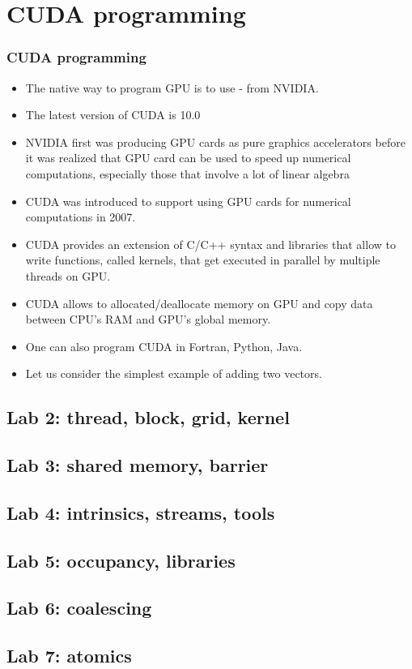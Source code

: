 \section{CUDA programming}
\begin{frame}[fragile]
  \frametitle{CUDA programming}
\begin{itemize}
\item The native way to program GPU is to use  - from NVIDIA. 
\item The latest version of CUDA is 10.0
\item NVIDIA first was producing GPU cards as pure graphics accelerators before it was realized that GPU card can be used to speed up numerical computations, especially those that involve a lot of linear algebra
\item CUDA was introduced to support using GPU cards for numerical computations in 2007.
\item CUDA provides an extension of C/C++ syntax and libraries that allow to write functions, called {\color{mycolordef}kernels}, that get executed in parallel by multiple threads on GPU. 
\item CUDA allows to allocated/deallocate memory on GPU and copy data between CPU's RAM and GPU's global memory.
\item One can also program CUDA in Fortran, Python, Java.
\item Let us consider the simplest example of adding two vectors.
\end{itemize}
\end{frame}

\subsection{Lab 2: thread, block, grid, kernel}


\subsection{Lab 3: shared memory, barrier}


\subsection{Lab 4: intrinsics, streams, tools}


\subsection{Lab 5: occupancy, libraries}


\subsection{Lab 6: coalescing}


\subsection{Lab 7: atomics}





